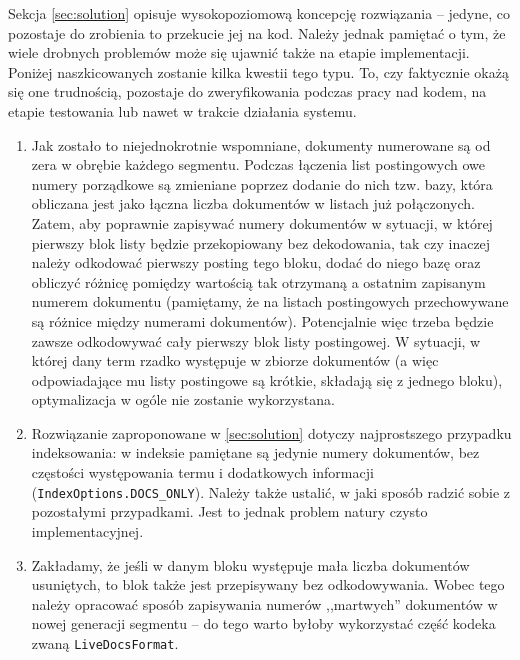 Sekcja \ref{sec:solution} opisuje wysokopoziomową koncepcję rozwiązania -- jedyne, co pozostaje do zrobienia to przekucie jej na kod. Należy jednak pamiętać o tym, że wiele drobnych problemów może się ujawnić także na etapie implementacji. Poniżej naszkicowanych zostanie kilka kwestii tego typu. To, czy faktycznie okażą się one trudnością, pozostaje do zweryfikowania podczas pracy nad kodem, na etapie testowania lub nawet w trakcie działania systemu. 
\begin{enumerate}
 \item Jak zostało to niejednokrotnie wspomniane, dokumenty numerowane są od zera w obrębie każdego segmentu. Podczas łączenia list postingowych owe numery porządkowe są zmieniane poprzez dodanie do nich tzw. bazy, która obliczana jest jako łączna liczba dokumentów w listach już połączonych. Zatem, aby poprawnie zapisywać numery dokumentów w sytuacji, w której pierwszy blok listy będzie przekopiowany bez dekodowania, tak czy inaczej należy odkodować pierwszy posting tego bloku, dodać do niego bazę oraz obliczyć różnicę pomiędzy wartością tak otrzymaną a ostatnim zapisanym numerem dokumentu (pamiętamy, że na listach postingowych przechowywane są różnice między numerami dokumentów). Potencjalnie więc trzeba będzie zawsze odkodowywać cały pierwszy blok listy postingowej. W sytuacji, w której dany term rzadko występuje w zbiorze dokumentów (a więc odpowiadające mu listy postingowe są krótkie, składają się z jednego bloku), optymalizacja w ogóle nie zostanie wykorzystana.
 \item Rozwiązanie zaproponowane w \ref{sec:solution} dotyczy najprostszego przypadku indeksowania: w  indeksie pamiętane są jedynie numery dokumentów, bez częstości występowania termu i dodatkowych informacji (\texttt{IndexOptions.DOCS\_ONLY}). Należy także ustalić, w jaki sposób radzić sobie z pozostałymi przypadkami. Jest to jednak problem natury czysto implementacyjnej.
 \item Zakładamy, że jeśli w danym bloku występuje mała liczba dokumentów usuniętych, to blok także jest przepisywany bez odkodowywania. Wobec tego należy opracować sposób zapisywania numerów ,,martwych'' dokumentów w nowej generacji segmentu -- do tego warto byłoby wykorzystać część kodeka zwaną \texttt{LiveDocsFormat}.

\end{enumerate}
